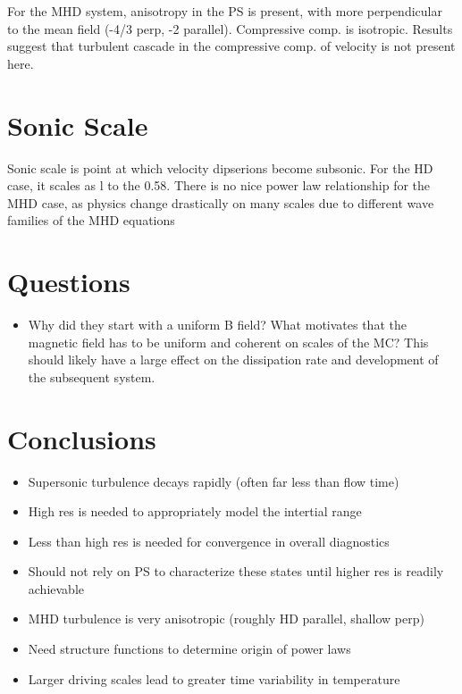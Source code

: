 \documentclass[a4paper]{article}
\begin{document}
For the MHD system, anisotropy in the PS is present, with more perpendicular
to the mean field (-4/3 perp, -2 parallel). Compressive comp. is isotropic. 
Results suggest that turbulent cascade in the compressive comp. of 
velocity is not present here.

\section{Sonic Scale}
Sonic scale is point at which velocity dipserions become subsonic. For the 
HD case, it scales as l to the 0.58. There is no nice power law relationship
for the MHD case, as physics change drastically on many scales due to 
different wave families of the MHD equations 
\section{Questions}
\begin{itemize}
\item Why did they start with a uniform B field? What motivates that the 
magnetic field has to be uniform and coherent on scales of the MC? This should
likely have a large effect on the dissipation rate and development of the 
subsequent system.
\end{itemize}

\section{Conclusions}
\begin{itemize}
\item Supersonic turbulence decays rapidly (often far less than flow time)
\item High res is needed to appropriately model the intertial range
\item Less than high res is needed for convergence in overall diagnostics
\item Should not rely on PS to characterize these states until higher res is
readily achievable
\item MHD turbulence is very anisotropic (roughly HD parallel, shallow perp)
\item Need structure functions to determine origin of power laws 
\item Larger driving scales lead to greater time variability in temperature

\end{itemize}
\end{document}
